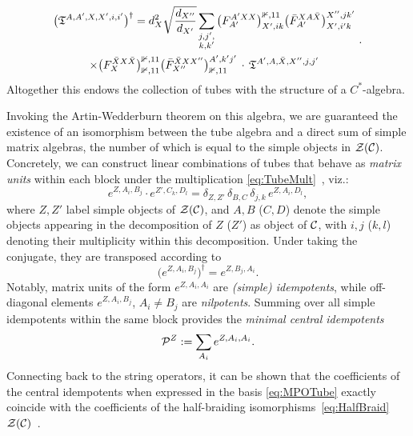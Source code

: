 \begin{equation}
\begin{gathered}
	\big(\mathfrak{T}^{A,A',X,X',i,i'} \big)^\dagger =
	d_X^2 \sqrt{\frac{d_{X''}}{d_{X'}}}
	\sum_{\substack{j,j',\\k,k'}}
	\big( F^{A'XX}_{A'} \big)_{X',ik}^{\mathbb 1, 11}
	\big( \bar F^{XA\bar X}_{A'} \big)_{X',i'k}^{X'',jk'} \\
	\times
	\big( F^{\bar XX\bar X}_X\big)_{\mathbb 1, 11}^{\mathbb 1, 11}
	\big(\bar F^{\bar XXX''}_{X''}\big)_{\mathbb 1,11}^{A',k'j'}
	\,\cdot\,
	\mathfrak{T}^{A',A,\bar X,X'',j,j'}
\end{gathered}\,\,.
\end{equation}
Altogether this endows the collection of tubes with the structure of a $C^*$-algebra.

\bigskip\noindent Invoking the Artin-Wedderburn theorem on this algebra, we are guaranteed the existence of an isomorphism between the tube algebra and a direct sum of simple matrix algebras, the number of which is equal to the simple objects in $\mathcal{Z}(\mathcal{C})$. Concretely, we can construct linear combinations of tubes that behave as \emph{matrix units} within each block under the multiplication \cref{eq:TubeMult}~\cite{Izumi2000,Bultinck2015,Lootens2021a,Lootens2022}, viz.:
\begin{equation}
	e^{Z,A_i,B_j} \cdot e^{Z',C_k,D_l} = \delta_{Z,Z'} \, \delta_{B,C}\, \delta_{j,k}\,  e^{Z,A_i,D_l},
\end{equation}
where $Z,Z'$ label simple objects of $\mathcal{Z}(\mathcal{C})$, and $A,B$ ($C,D$) denote the simple objects appearing in the decomposition of $Z$ ($Z'$) as object of $\mathcal{C}$, with $i,j$ ($k,l$) denoting their multiplicity within this decomposition. Under taking the conjugate, they are transposed according to
\begin{equation}
	\big( e^{Z,A_i,B_j} \big)^\dagger = e^{Z,B_j,A_i}.
\end{equation}
Notably, matrix units of the form $e^{Z,A_i,A_i}$ are \emph{(simple) idempotents}, while off-diagonal elements $e^{Z,A_i,B_j}$, $A_i\neq B_j$ are \emph{nilpotents}. Summing over all simple idempotents within the same block provides the \emph{minimal central idempotents}
\begin{equation}
	\mathcal{P}^Z := \sum_{A_i} e^{Z,A_i,A_i}.
\end{equation}
Connecting back to the string operators, it can be shown that the coefficients of the central idempotents when expressed in the basis \cref{eq:MPOTube} exactly coincide with the coefficients of the half-braiding isomorphisms~\cref{eq:HalfBraid} $\mathcal{Z}(\mathcal{C})$~\cite{Izumi2000,Lan2013,Lootens2022}.

